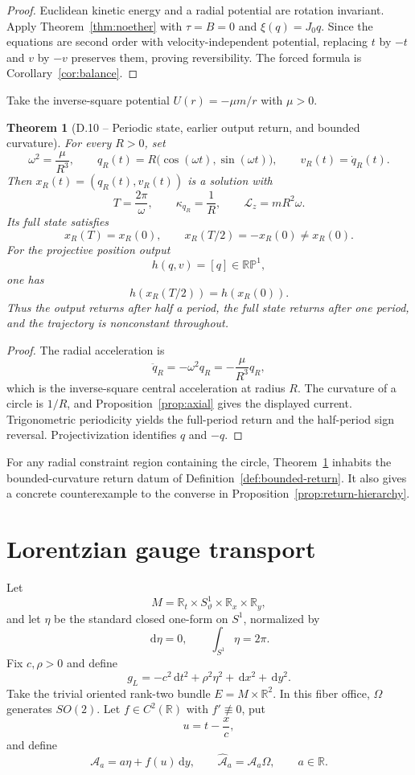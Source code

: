 \documentclass[11pt,letterpaper]{article}
\theoremstyle{dynamicsstyle}
\newtheorem{theorem}{Theorem}[section]
\newcommand{\R}{\mathbb{R}}
\newcommand{\dd}{\,\mathrm d}
\begin{document}
\begin{proof}
Euclidean kinetic energy and a radial potential are rotation invariant.  Apply Theorem~\ref{thm:noether} with $\tau=B=0$ and $\xi(q)=J_0q$.  Since the equations are second order with velocity-independent potential, replacing $t$ by $-t$ and $v$ by $-v$ preserves them, proving reversibility.  The forced formula is Corollary~\ref{cor:balance}.
\end{proof}

Take the inverse-square potential $U(r)=-\mu m/r$ with $\mu>0$.

\begin{theorem}[D.10 -- Periodic state, earlier output return, and bounded curvature]\label{thm:orbit}
For every $R>0$, set
\[
\omega^2=\frac{\mu}{R^3},
\qquad
q_R(t)=R\bigl(\cos(\omega t),\sin(\omega t)\bigr),
\qquad
v_R(t)=\dot q_R(t).
\]
Then $x_R(t)=(q_R(t),v_R(t))$ is a solution with
\[
T=\frac{2\pi}{\omega},
\qquad
\kappa_{q_R}=\frac1R,
\qquad
\mathcal L_z=mR^2\omega.
\]
Its full state satisfies
\[
x_R(T)=x_R(0),
\qquad
x_R(T/2)=-x_R(0)\ne x_R(0).
\]
For the projective position output
\[
h(q,v)=[q]\in\R\mathbb P^1,
\]
one has
\[
h(x_R(T/2))=h(x_R(0)).
\]
Thus the output returns after half a period, the full state returns after one period, and the trajectory is nonconstant throughout.
\end{theorem}

\begin{proof}
The radial acceleration is
\[
\ddot q_R=-\omega^2q_R=-\frac{\mu}{R^3}q_R,
\]
which is the inverse-square central acceleration at radius $R$.  The curvature of a circle is $1/R$, and Proposition~\ref{prop:axial} gives the displayed current.  Trigonometric periodicity yields the full-period return and the half-period sign reversal.  Projectivization identifies $q$ and $-q$.
\end{proof}

For any radial constraint region containing the circle, Theorem~\ref{thm:orbit} inhabits the bounded-curvature return datum of Definition~\ref{def:bounded-return}.  It also gives a concrete counterexample to the converse in Proposition~\ref{prop:return-hierarchy}.

\section{Lorentzian gauge transport}\label{sec:gauge}

Let
\[
M=\R_t\times S^1_\vartheta\times\R_x\times\R_y,
\]
and let $\eta$ be the standard closed one-form on $S^1$, normalized by
\[
\dd\eta=0,
\qquad
\int_{S^1}\eta=2\pi.
\]
Fix $c,\rho>0$ and define
\[
g_L=-c^2\dd t^2+\rho^2\eta^2+\dd x^2+\dd y^2.
\]
Take the trivial oriented rank-two bundle $E=M\times\R^2$.  In this fiber office, $\Omega$ generates $SO(2)$.  Let $f\in C^2(\R)$ with $f'\not\equiv0$, put
\[
u=t-\frac{x}{c},
\]
and define
\[
\mathcal A_a=a\eta+f(u)\dd y,
\qquad
\widehat{\mathcal A}_a=\mathcal A_a\Omega,
\qquad
a\in\R.
\]
\end{document}
